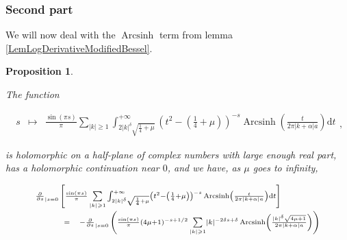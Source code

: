 \documentclass{jams-l}
\newtheorem{proposition}[theorem]{Proposition}
\theoremstyle{definition}
\theoremstyle{remark}
\numberwithin{equation}{section}
\DeclareMathOperator{\arcsinh}{Arcsinh}
\begin{document}
            
            \subsubsection*{\textbf{Second part}}
            \label{MTildeSecondPart}
                
                We will now deal with the $\arcsinh$ term from lemma \ref{LemLogDerivativeModifiedBessel}.
                
                \begin{proposition}
                \label{PropMTilde2}
                
                    The function
                    
                    \[ \begin{array}{lll}
                            s & \longmapsto & \frac{\sin \left( \pi s \right)}{\pi} \sum\limits_{\left \vert k \right \vert \geqslant 1} \int_{2 \left \vert k \right \vert^{\delta} \sqrt{\frac{1}{4} + \mu}}^{+ \infty} \left( t^2 - \left( \frac{1}{4} + \mu \right) \right)^{-s} \arcsinh \left( \frac{t}{2 \pi \left \vert k + \alpha \right \vert a} \right) \mathrm{d}t
                        \end{array} , \]
                    
                    \noindent is holomorphic on a half-plane of complex numbers with large enough real part, has a holomorphic continuation near $0$, and we have, as $\mu$ goes to infinity,
                    
                    \[ \begin{array}{lll}
                            \multicolumn{3}{l}{\scriptstyle \frac{\partial}{\partial s}_{\left \vert s = 0 \right.} \left[ \frac{\sin \left( \pi s \right)}{\pi} \sum\limits_{\left \vert k \right \vert \geqslant 1} \int_{2 \left \vert k \right \vert^{\delta} \sqrt{\frac{1}{4} + \mu}}^{+ \infty} \left( t^2 - \left( \frac{1}{4} + \mu \right) \right)^{-s} \arcsinh \left( \frac{t}{2 \pi \left \vert k + \alpha \right \vert a} \right) \mathrm{d}t \right]} \\[1em]
                            
                            \qquad & \scriptstyle = & \scriptstyle - \frac{\partial}{\partial s}_{\left \vert s = 0 \right.} \left( \frac{\sin \left( \pi s \right)}{\pi} \left( 4 \mu + 1 \right)^{-s+1/2} \sum\limits_{\left \vert k \right \vert \geqslant 1} \left \vert k \right \vert^{-2 \delta s + \delta} \arcsinh \left( \frac{\left \vert k \right \vert^{\delta} \sqrt{4 \mu + 1}}{2 \pi \left \vert k + \alpha \right \vert a} \right) \right) \\[1em]
                            

\end{array}\]
\end{proposition}
\end{document}
